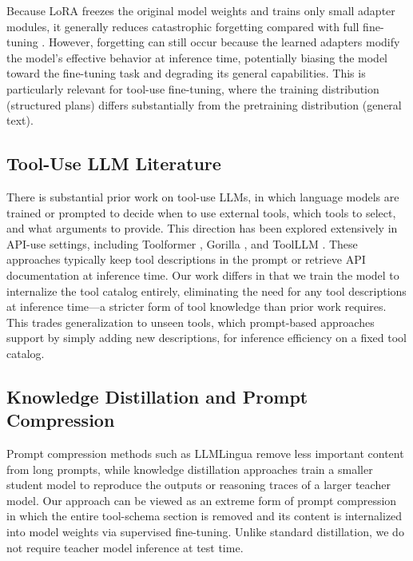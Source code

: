 \documentclass[conference]{IEEEtran}
\begin{document}
Because LoRA freezes the original model weights and trains only small adapter modules, it generally reduces catastrophic forgetting compared with full fine-tuning \cite{b7}. However, forgetting can still occur because the learned adapters modify the model's effective behavior at inference time, potentially biasing the model toward the fine-tuning task and degrading its general capabilities. This is particularly relevant for tool-use fine-tuning, where the training distribution (structured plans) differs substantially from the pretraining distribution (general text).

\subsection{Tool-Use LLM Literature}

There is substantial prior work on tool-use LLMs, in which language models are trained or prompted to decide when to use external tools, which tools to select, and what arguments to provide. This direction has been explored extensively in API-use settings, including Toolformer \cite{b8}, Gorilla \cite{b9}, and ToolLLM \cite{b10}. These approaches typically keep tool descriptions in the prompt or retrieve API documentation at inference time. Our work differs in that we train the model to internalize the tool catalog entirely, eliminating the need for any tool descriptions at inference time---a stricter form of tool knowledge than prior work requires. This trades generalization to unseen tools, which prompt-based approaches support by simply adding new descriptions, for inference efficiency on a fixed tool catalog.

\subsection{Knowledge Distillation and Prompt Compression}

Prompt compression methods such as LLMLingua \cite{b11} remove less important content from long prompts, while knowledge distillation approaches \cite{b12} train a smaller student model to reproduce the outputs or reasoning traces of a larger teacher model. Our approach can be viewed as an extreme form of prompt compression in which the entire tool-schema section is removed and its content is internalized into model weights via supervised fine-tuning. Unlike standard distillation, we do not require teacher model inference at test time.


\end{document}
